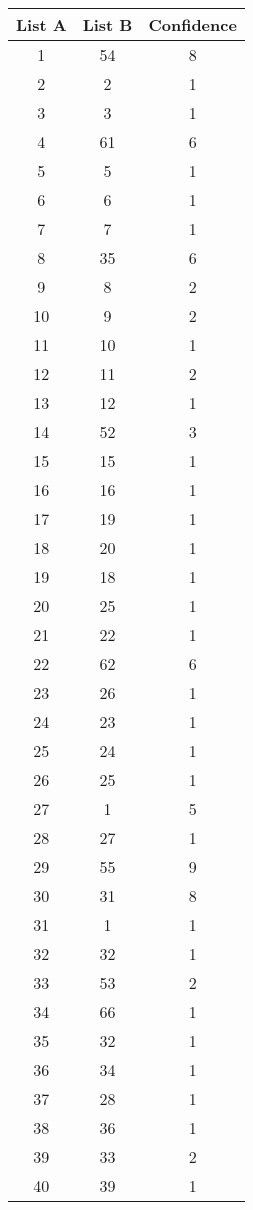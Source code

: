 \ \ 

\newpage

\ \ 

\begin{center}

\begin{tabular}{c c c} 
List A  & List B & Confidence \\ \hline

  1  &  54  &    8 \\
  2  &   2  &    1 \\
  3  &   3  &    1 \\
  4  &  61  &    6 \\
  5  &   5  &    1 \\
  6  &   6  &    1 \\
  7  &   7  &    1 \\
  8  &  35  &    6 \\
  9  &   8  &    2 \\ 
 10  &   9  &    2 \\
 11  &  10  &    1 \\
 12  &  11  &    2 \\
 13  &  12  &    1 \\
 14  &  52  &    3 \\
 15  &  15  &    1 \\
 16  &  16  &    1 \\
 17  &  19  &    1 \\
 18  &  20  &    1 \\
 19  &  18  &    1 \\
 20  &  25  &    1 \\
 21  &  22  &    1 \\
 22  &  62  &    6 \\
 23  &  26  &    1 \\
 24  &  23  &    1 \\
 25  &  24  &    1 \\ 
 26  &  25  &    1 \\
 27  &   1  &    5 \\
 28  &  27  &    1 \\ 
 29  &  55  &    9 \\
 30  &  31  &    8 \\ 
 31  &   1  &    1 \\
 32  &  32  &    1 \\
 33  &  53  &    2 \\
 34  &  66  &    1 \\
 35  &  32  &    1 \\
 36  &  34  &    1 \\
 37  &  28  &    1 \\
 38  &  36  &    1 \\
 39  &  33  &    2 \\
 40  &  39  &    1 
\end{tabular}
\end{center}

